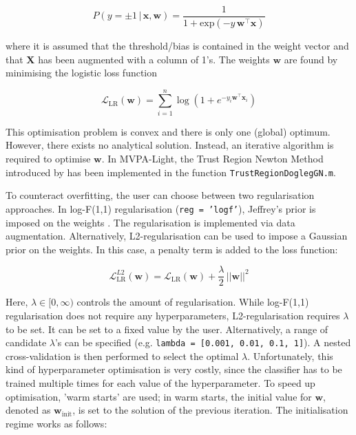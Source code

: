 \documentclass[utf8]{frontiersSCNS} %
\newcommand{\w}{\mathbf{w}}
\newcommand{\x}{\mathbf{x}}
\renewcommand{\L}{\mathcal{L}}
\newcommand{\X}{\mathbf{X}}
\newcommand{\ttt}[1]{\texttt{#1}}
\begin{document}
\begin{equation}
\label{eq:logreg_probability}
P(y = \pm 1\,|\,\x,\w) = \frac{1}{1 + \text{exp}(-y\,\w^\top\x)}
\end{equation}

where it is assumed that the threshold/bias is contained in the weight vector and that $\X$ has been augmented with a column of 1's. The weights $\w$ are found by minimising the logistic loss function

\begin{equation}
\label{eq:logreg_loss_function}
\L_\text{LR}(\w) = \sum_{i=1}^n \log(1 + e^{-y_i\w^\top\x_i})
\end{equation}

This optimisation problem is convex and there is only one (global) optimum. However, there exists no analytical solution. Instead, an iterative algorithm is required to optimise $\w$. In MVPA-Light, the Trust Region Newton Method introduced by \cite{Lin2007TrustRegression} has been implemented in the function \ttt{TrustRegionDoglegGN.m}.

To counteract overfitting, the user can choose between two regularisation approaches. In log-F(1,1) regularisation (\ttt{reg = 'logf'}), Jeffrey's prior is imposed on the weights \citep{Firth1993BiasEstimates,Rahman2017PerformanceData.,King2001}. The regularisation is implemented via data augmentation. Alternatively, L2-regularisation can be used to impose a Gaussian prior on the weights. In this case, a penalty term is added to the loss function:

\begin{equation}
\label{eq:logreg_loss_function_plus_penalty}
\L_\text{LR}^{L2}(\w) = \L_\text{LR}(\w) + \frac{\lambda}{2}\, ||\w||^2
\end{equation}

Here, $\lambda\in [0,\infty)$ controls the amount of regularisation. While log-F(1,1) regularisation does not require any hyperparameters, L2-regularisation requires $\lambda$ to be set. It can be set to a fixed value by the user. Alternatively, a range of candidate $\lambda$'s can be specified (e.g. \ttt{lambda = [0.001, 0.01, 0.1, 1]}). A nested cross-validation is then performed to select the optimal $\lambda$.
Unfortunately, this kind of hyperparameter optimisation is very costly, since the classifier has to be trained multiple times for each value of the hyperparameter. To speed up optimisation, 'warm starts' are used; in warm starts, the initial value for $\w$, denoted as  $\w_\text{init}$, is set to the solution of the previous iteration. The initialisation regime works as follows:
\end{document}
